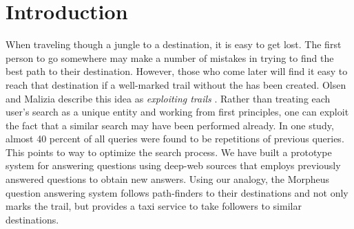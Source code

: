 \section{Introduction}
When traveling though a jungle to a destination, it is easy to get
lost.  The first person to go somewhere may make a number of mistakes
in trying to find the best path to their destination.  However, those
who come later will find it easy to reach that destination if a
well-marked trail without the has been created. Olsen and Malizia
describe this idea as \emph{exploiting trails} \cite{5379671}.  Rather
than treating each user's search as a unique entity and working from
first principles, one can exploit the fact that a similar search may
have been performed already.  In one study, almost 40 percent of all
queries were found to be repetitions of previous
queries.\cite{1277770} This points to way to optimize the search
process.  We have built a prototype system for answering questions
using deep-web sources that employs previously answered questions to
obtain new answers.  Using our analogy, the Morpheus question
answering system follows path-finders to their destinations and not
only marks the trail, but provides a taxi service to take followers to
similar destinations.

